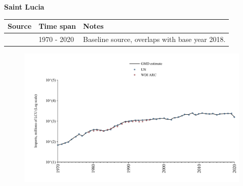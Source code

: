 \documentclass[12pt,a4paper,landscape]{article}
\begin{document}
\begin{adjustbox}{max totalsize={\paperwidth}{\paperheight},center}
\begin{minipage}[t][\textheight][t]{\textwidth}
\vspace*{0.5cm}
{}
\begin{center}
{\Large\bfseries Saint Lucia}
\end{center}
\vspace{0.5cm}
\begin{table}[H]
\centering
\small
\begin{tabular}{|l|l|l|}
\hline
\textbf{Source} & \textbf{Time span} & \textbf{Notes} \\
\hline
\rowcolor{white}\cite{UN}& 1970 - 2020 &Baseline source, overlaps with base year 2018.\\
\hline
\end{tabular}
\end{table}
\begin{figure}[H]
\centering
\includegraphics[width=\textwidth,height=0.6\textheight,keepaspectratio]{graphs/LCA_imports.pdf}
\end{figure}
\end{minipage}
\end{adjustbox}
\end{document}

